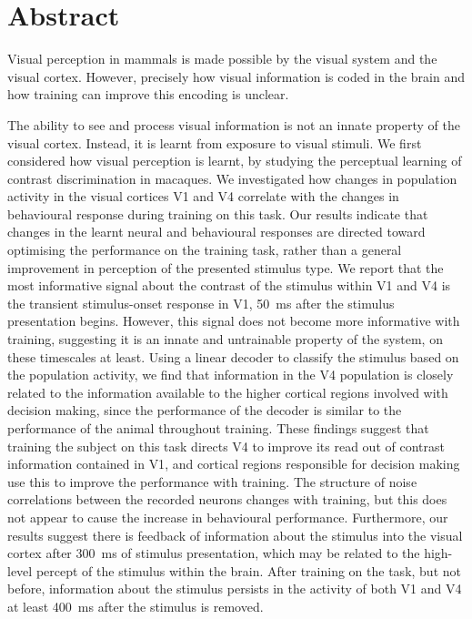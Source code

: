 
\begingroup

\let\clearpage\relax
\let\cleardoublepage\relax
\let\cleardoublepage\relax

\chapter*{Abstract}

Visual perception in mammals is made possible by the visual system and the visual cortex.
However, precisely how visual information is coded in the brain and how training can improve this encoding is unclear.

The ability to see and process visual information is not an innate property of the visual cortex.
Instead, it is learnt from exposure to visual stimuli.
We first considered how visual perception is learnt, by studying the perceptual learning of contrast discrimination in macaques.
We investigated how changes in population activity in the visual cortices \acs{V1} and \acs{V4} correlate with the changes in behavioural response during training on this task.
Our results indicate that changes in the learnt neural and behavioural responses are directed toward optimising the performance on the training task, rather than a general improvement in perception of the presented stimulus type.
We report that the most informative signal about the contrast of the stimulus within \acs{V1} and \acs{V4} is the transient stimulus-onset response in \acs{V1}, \SI{50}{\milli\second} after the stimulus presentation begins.
However, this signal does not become more informative with training, suggesting it is an innate and untrainable property of the system, on these timescales at least.
Using a linear decoder to classify the stimulus based on the population activity, we find that information in the \acs{V4} population is closely related to the information available to the higher cortical regions involved with decision making, since the performance of the decoder is similar to the performance of the animal throughout training.
These findings suggest that training the subject on this task directs \acs{V4} to improve its read out of contrast information contained in \acs{V1}, and cortical regions responsible for decision making use this to improve the performance with training.
The structure of noise correlations between the recorded neurons changes with training, but this does not appear to cause the increase in behavioural performance.
Furthermore, our results suggest there is feedback of information about the stimulus into the visual cortex after \SI{300}{\milli\second} of stimulus presentation, which may be related to the high-level percept of the stimulus within the brain.
After training on the task, but not before, information about the stimulus persists in the activity of both \acs{V1} and \acs{V4} at least \SI{400}{\milli\second} after the stimulus is removed.

